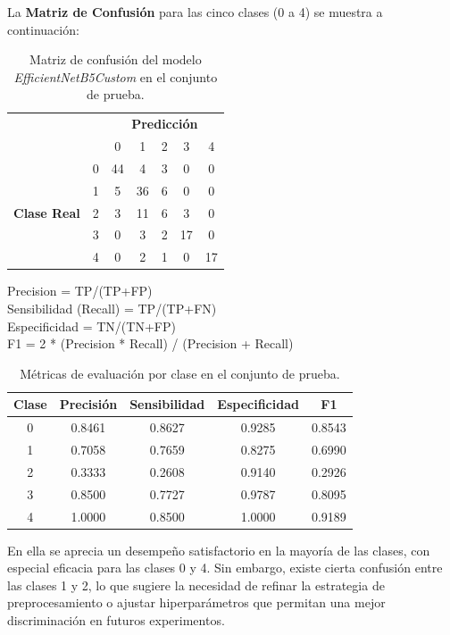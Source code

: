 \documentclass[11pt,spanish,listoffigures,listoftables]{tfgetsinf}
\begin{document}
La \textbf{Matriz de Confusión} para las cinco clases (0 a 4) se muestra a continuación:

\begin{table}[h]
\centering
\begin{tabular}{cc|ccccc}
    & \multicolumn{1}{c}{} & \multicolumn{5}{c}{\textbf{Predicción}} \\ 
    & \multicolumn{1}{c}{} & 0 & 1 & 2 & 3 & 4 \\ \cline{3-7}
\multirow{5}{*}{\textbf{Clase Real}}    
& 0 & 44 & 4  & 3 & 0  & 0 \\
& 1 & 5  & 36 & 6 & 0  & 0 \\
& 2 & 3  & 11 & 6 & 3  & 0 \\
& 3 & 0  & 3  & 2 & 17 & 0 \\
& 4 & 0  & 2  & 1 & 0  & 17 \\
\end{tabular}
\caption{Matriz de confusión del modelo \textit{EfficientNetB5Custom} en el conjunto de prueba.}
\end{table}

Precision = TP/(TP+FP) \\
Sensibilidad (Recall) = TP/(TP+FN) \\
Especificidad = TN/(TN+FP) \\
F1 = 2 * (Precision * Recall) / (Precision + Recall) \\

\begin{table}[h]
\centering
\begin{tabular}{c|cccc}
\hline
\textbf{Clase} & \textbf{Precisión} & \textbf{Sensibilidad} & \textbf{Especificidad} & \textbf{F1} \\
\hline
0 & 0.8461 & 0.8627 & 0.9285 & 0.8543 \\
1 & 0.7058 & 0.7659 & 0.8275 & 0.6990 \\
2 & 0.3333 & 0.2608 & 0.9140 & 0.2926 \\
3 & 0.8500 & 0.7727 & 0.9787 & 0.8095 \\
4 & 1.0000 & 0.8500 & 1.0000 & 0.9189 \\
\hline
\end{tabular}
\caption{Métricas de evaluación por clase en el conjunto de prueba.}
\label{tab:metricas-clase}
\end{table}

En ella se aprecia un desempeño satisfactorio en la mayoría de las clases, con especial eficacia para las clases 0 y 4. Sin embargo, existe cierta confusión entre las clases 1 y 2, lo que sugiere la necesidad de refinar la estrategia de preprocesamiento o ajustar hiperparámetros que permitan una mejor discriminación en futuros experimentos.
\end{document}
